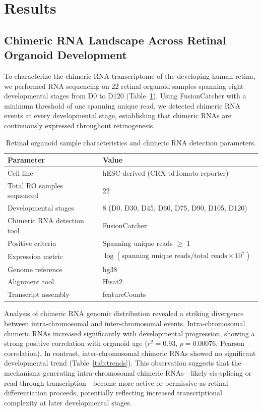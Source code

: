 \documentclass[12pt]{article}
\begin{document}
\section{Results}

\subsection{Chimeric RNA Landscape Across Retinal Organoid Development}

To characterize the chimeric RNA transcriptome of the developing human retina, we performed RNA sequencing on 22 retinal organoid samples spanning eight developmental stages from D0 to D120 (Table~\ref{tab:samples}). Using FusionCatcher with a minimum threshold of one spanning unique read, we detected chimeric RNA events at every developmental stage, establishing that chimeric RNAs are continuously expressed throughout retinogenesis.

\begin{table}[htbp]
\centering
\caption{Retinal organoid sample characteristics and chimeric RNA detection parameters.}
\label{tab:samples}
\begin{tabular}{lll}
\toprule
Parameter & Value \\
\midrule
Cell line & hESC-derived (CRX-tdTomato reporter) \\
Total RO samples sequenced & 22 \\
Developmental stages & 8 (D0, D30, D45, D60, D75, D90, D105, D120) \\
Chimeric RNA detection tool & FusionCatcher \\
Positive criteria & Spanning unique reads $\geq$ 1 \\
Expression metric & $\log(\text{spanning unique reads}/\text{total reads} \times 10^7)$ \\
Genome reference & hg38 \\
Alignment tool & Hisat2 \\
Transcript assembly & featureCounts \\
\bottomrule
\end{tabular}
\end{table}

Analysis of chimeric RNA genomic distribution revealed a striking divergence between intra-chromosomal and inter-chromosomal events. Intra-chromosomal chimeric RNAs increased significantly with developmental progression, showing a strong positive correlation with organoid age ($r^2 = 0.93$, $p = 0.00076$, Pearson correlation). In contrast, inter-chromosomal chimeric RNAs showed no significant developmental trend (Table~\ref{tab:trends}). This observation suggests that the mechanisms generating intra-chromosomal chimeric RNAs---likely cis-splicing or read-through transcription---become more active or permissive as retinal differentiation proceeds, potentially reflecting increased transcriptional complexity at later developmental stages.
\end{document}
